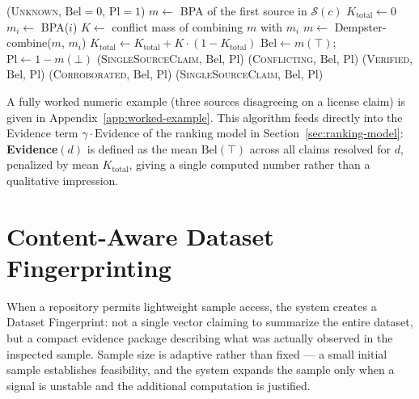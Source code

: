 \documentclass[11pt]{article}
\begin{document}
\begin{algorithm}[h]
\caption{Evidence Resolution for a Single Claim}
\label{alg:resolver}
\begin{algorithmic}[1]
    \State \Return (\textsc{Unknown}, $\mathrm{Bel}=0$, $\mathrm{Pl}=1$)
  \EndIf
  \State $m \gets$ BPA of the first source in $\mathcal{S}(c)$
  \State $K_{\text{total}} \gets 0$
    \State $m_i \gets$ BPA($i$) 
    \State $K \gets$ conflict mass of combining $m$ with $m_i$
    \State $m \gets$ Dempster-combine($m$, $m_i$)
    \State $K_{\text{total}} \gets K_{\text{total}} + K \cdot (1 - K_{\text{total}})$
    \Comment{running conflict, bounded in $[0,1)$}
  \EndFor
  \State $\mathrm{Bel} \gets m(\top)$; \quad $\mathrm{Pl} \gets 1 - m(\bot)$
    \State \Return (\textsc{SingleSourceClaim}, $\mathrm{Bel}$, $\mathrm{Pl}$)
    \State \Return (\textsc{Conflicting}, $\mathrm{Bel}$, $\mathrm{Pl}$)
    \State \Return (\textsc{Verified}, $\mathrm{Bel}$, $\mathrm{Pl}$)
    \State \Return (\textsc{Corroborated}, $\mathrm{Bel}$, $\mathrm{Pl}$)
  \Else
    \State \Return (\textsc{SingleSourceClaim}, $\mathrm{Bel}$, $\mathrm{Pl}$) 
  \EndIf
\EndFunction
\end{algorithmic}
\end{algorithm}

A fully worked numeric example (three sources disagreeing on a license claim) is given in
Appendix~\ref{app:worked-example}. This algorithm feeds directly into the Evidence term $\gamma \cdot
\mathrm{Evidence}$ of the ranking model in Section~\ref{sec:ranking-model}: \textbf{Evidence}$(d)$ is
defined as the mean $\mathrm{Bel}(\top)$ across all claims resolved for $d$, penalized by mean
$K_{\text{total}}$, giving a single computed number rather than a qualitative impression.

\section{Content-Aware Dataset Fingerprinting}
When a repository permits lightweight sample access, the system creates a Dataset Fingerprint: not a
single vector claiming to summarize the entire dataset, but a compact evidence package describing what was
actually observed in the inspected sample. Sample size is adaptive rather than fixed --- a small initial
sample establishes feasibility, and the system expands the sample only when a signal is unstable and the
additional computation is justified.
\end{document}
